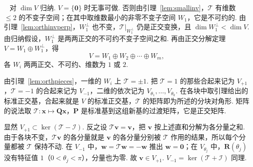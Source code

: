\documentclass[lang=cn,10.5pt,scheme=chinese,toc=twocol,section,chinesefont=nofont,
twoside,citestyle=gb7714-2015,bibstyle=gb7714-2015]{elegantbook}
\newcommand{\vv}[1]{\boldsymbol{#1}}
\newcommand{\zero}{\boldsymbol{0}}          %
\numberwithin{equation}{section}   %
\newcommand*{\lnlabel}[1]{{\sffamily\bfseries\color{black}#1}}
\renewenvironment{proof}{%
	\par\noindent\lnlabel{\proofname}\;\ \color{black!90}\cfs}{\par}
\begin{document}
\begin{proof}
  对 $\dim V$ 归纳. $V=\{\zero\}$ 时无事可做. 否则由引理~\ref{lem:smallinv}，$\mathscr T$ 有维数 $\le2$ 的不变子空间；在其中取维数最小的非零不变子空间 $W_1$，它是不可约的. 由引理~\ref{lem:orthinvperp}，$W_1^\perp$ 也不变，$\mathscr T|_{W_1^\perp}$ 仍是正交变换，且 $\dim W_1^\perp<\dim V$. 由归纳假设，$W_1^\perp$ 是两两正交的不可约不变子空间之和. 再由正交分解定理 $V=W_1\oplus W_1^\perp$，得
  \[V=W_1\oplus W_2\oplus\cdots\oplus W_m,\]
  各 $W_i$ 两两正交、不可约、维数为 $1$ 或 $2$.

  由引理~\ref{lem:orthpieces}，一维的 $W_i$ 上 $\mathscr T=\pm1$. 把 $\mathscr T=1$ 的那些合起来记为 $V_{+1}$，$\mathscr T=-1$ 的合起来记为 $V_{-1}$，二维的依次记为 $V_{\theta_1},\ldots,V_{\theta_k}$. 在各块中取引理给出的标准正交基，合起来就是 $V$ 的标准正交基，$\mathscr T$ 的矩阵即为所述的分块对角形. 矩阵的说法取 $\mathscr T:\vv x\mapsto\vv{Qx}$，$\vv P$ 是标准基到这组新基的过渡矩阵，它是正交矩阵.

  显然 $V_{+1}\subset\ker(\mathscr T-\mathscr I)$. 反之设 $\mathscr T\vv v=\vv v$，把 $\vv v$ 按上述直和分解为各分量之和. 由于各块不变，$\mathscr T\vv v$ 的各分量就是 $\vv v$ 的各分量分别被 $\mathscr T$ 作用的结果，所以每个分量都被 $\mathscr T$ 保持不动. 在 $V_{-1}$ 中，$\vv w=\mathscr T\vv w=-\vv w$ 推出 $\vv w=\zero$；在 $V_{\theta_j}$ 中，$\vv R(\theta_j)$ 没有特征值 $1$（$0<\theta_j<\pi$），分量也为零. 故 $\vv v\in V_{+1}$. $V_{-1}=\ker(\mathscr T+\mathscr I)$ 同理.
\end{proof}
\end{document}

